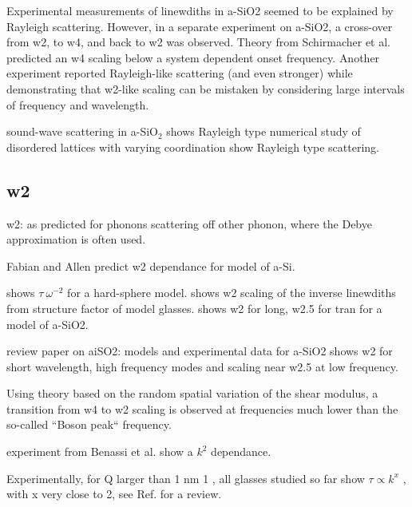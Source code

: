 \documentclass[aps,prb,twocolumn,superscriptaddress,footinbib,amsmath,amssymb,floatfix]{revtex4}
\begin{document}
Experimental measurements of linewdiths in a-SiO2 
seemed to be explained by Rayleigh scattering.
\cite{wischnewski_sound-wave_1998}
However, in a separate experiment on a-SiO2, 
a cross-over from w2, to w4, and back to w2 was observed.
\cite{masciovecchio_evidence_2006} Theory from Schirmacher et al. predicted 
an w4 scaling below a system dependent onset frequency.
\cite{schirmacher_thermal_2006,schirmacher_acoustic_2007}
Another experiment reported Rayleigh-like scattering (and even 
stronger) while demonstrating that w2-like scaling 
can be mistaken by considering large intervals of 
frequency and wavelength.\cite{ruffle_observation_2003}

sound-wave scattering in a-SiO$_2$ shows Rayleigh type 
\cite{wischnewski_sound-wave_1998}
numerical study of disordered lattices with varying coordination 
show Rayleigh type scattering.\cite{wyart_scaling_2010} 

\subsection{\label{S:Theory:Thermal}w2}

w2: as predicted for phonons scattering off other phonon, where 
the Debye approximation is often used. 

Fabian and Allen predict w2 dependance for model of a-Si.
\cite{fabian_theory_1999}

shows $\tau ~ \omega^{-2}$ for a hard-sphere model.
\cite{gotze_evolution_2000} 
shows w2 scaling of the inverse linewdiths from structure factor of model 
glasses.\cite{shintani_universal_2008}
shows w2 for long, w2.5 for tran for a model of a-SiO2.
\cite{horbach_high_2001}

review paper on aiSO2: models and experimental data for a-SiO2 shows w2 for 
short wavelength, high frequency modes and scaling near w2.5 at low frequency.
\cite{ruocco_high-frequency_2001} 

Using theory based on the random spatial variation of the shear modulus, 
a transition from w4 to w2 scaling is observed at frequencies much lower
than the so-called ``Boson peak`` frequency.
\cite{schirmacher_acoustic_2007}

experiment from Benassi et al. show a $k^2$ 
dependance.\cite{benassi_evidence_1996}

Experimentally, for Q larger
than 1 nm 1 , all glasses studied so far show $\tau \propto k^x$ , with x
very close to 2, see Ref.  for a review. 
\end{document}
